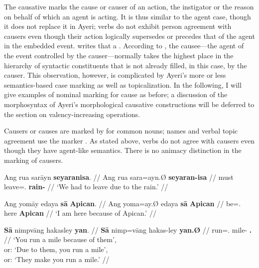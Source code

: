 The causative marks the cause or causer of an action, the instigator or the 
reason on behalf of which an agent is acting. It is thus similar to the agent 
case, though it does not replace it in Ayeri; verbs do not exhibit person 
agreement with causers even though their action logically supersedes or 
precedes that of the agent in the embedded event. \citet{dixon2000} writes that 
a . 
According to \citet[176]{comrie1989}, the causee---the agent of the event 
controlled by the causer---normally takes the highest place in the hierarchy of 
syntactic constituents that is not already filled, in this case, by the causer. 
This observation, however, is complicated by Ayeri's more or less 
semantics-based case marking as well as topicalization. In the following, I 
will give examples of nominal marking for cause as before; a discussion of the 
morphosyntax of Ayeri's morphological causative constructions will be deferred 
to the section on valency-increasing operations.

Causers or causes are marked by  for common nouns; names and 
verbal topic agreement use the marker . As stated above, verbs do 
not agree with causers even though they have agent-like semantics. There is no 
animacy distinction in the marking of causers.

\pex
\a\begingl
	\gla Ang rua sarāyn \textbf{seyaranisa}. //
	\glb Ang rua sara=ayn.Ø \textbf{seyaran-isa} //
	\glc \AgtT{} must leave=\Fpl{}.\Top{} \textbf{rain-\Caus{}} //
	\glft `We had to leave due to the rain.' //
\endgl

\a\begingl
	\gla Ang yomāy edaya \textbf{sā} \textbf{Apican}. //
	\glb Ang yoma=ay.Ø edaya \textbf{sā} \textbf{Apican} //
	\glc \AgtT{} be=\Fsg{}.\Top{} here \textbf{\Caus{}} \textbf{Apican} //
	\glft `I am here because of Apican.' //
\endgl

\a\label{ex:caustop}\begingl
	\gla \textbf{Sā} nimpvāng hakasley \textbf{yan}. //
	\glb \textbf{Sā} nimp=vāng hakas-ley \textbf{yan.Ø} //
	\glc \textbf{\CauT{}} run=\Ssg{}.\Aarg{} mile-\PargI{} 
		\textbf{\TplM{}.\Top{}} //
	\glft `You run a mile because of them',\\
		or: `Due to them, you run a mile',\\
		or: `They make you run a mile.' //
\endgl

\xe

